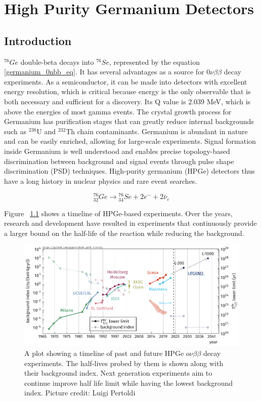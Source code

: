 \chapter{High Purity Germanium Detectors}
\label{chap:detectors}

\section{Introduction}
${}^{76}Ge$ double-beta decays into ${}^{76}Se$, represented by the equation \ref{germanium_0nbb_eq}. It has several advantages as a source for $0\nu\beta\beta$ decay experiments. As a semiconductor, it can be made into detectors with excellent energy resolution, which is critical because energy is the only observable that is both necessary and sufficient for a discovery. Its Q value is $2.039$ MeV, which is above the energies of most gamma events. The crystal growth process for Germanium has purification stages that can greatly reduce internal backgrounds such as $^{238}$U and $^{232}$Th chain contaminants. Germanium is abundant in nature and can be easily enriched, allowing for large-scale experiments. Signal formation inside Germanium is well understood and enables precise topology-based discrimination between background and signal events through pulse shape discrimination (PSD) techniques. High-purity germanium (HPGe) detectors thus have a long history in nuclear physics and rare event searches.


\begin{equation}\label{germanium_0nbb_eq}
{}_{32}^{76}Ge \rightarrow {}_{34}^{76}Se + 2e^- + 2\bar{\nu}_e
\end{equation}

Figure ~\ref{past_ge_exp} shows a timeline of HPGe-based experiments. Over the years, research and development have resulted in experiments that continuously provide a larger bound on the half-life of the reaction while reducing the background. 

\begin{figure}[!htb]
\centering
\includegraphics[trim=0.1cm 0 0.1cm 0,clip, width=0.99\linewidth]{ch2/figs/0nbb-ge76-history-future.pdf}
\caption{A plot showing a timeline of past and future HPGe $o\nu\beta\beta$ decay experiments. The half-lives probed by them is shown along with their background index. Next generation experiments aim to continue improve half life limit while having the lowest background index. Picture credit: Luigi Pertoldi}
\label{past_ge_exp}
\end{figure}



